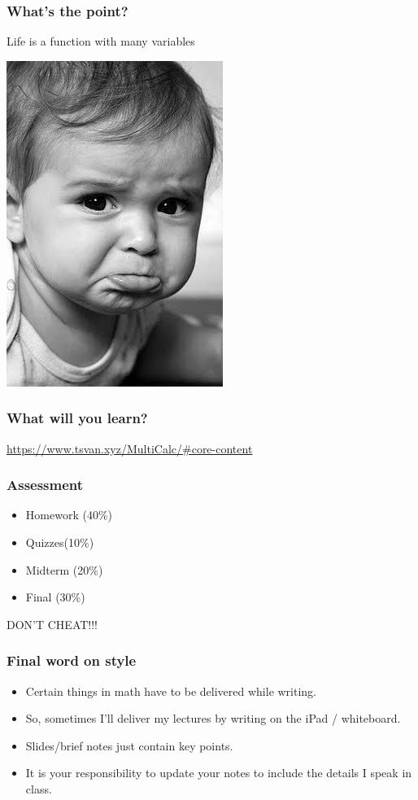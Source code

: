 \documentclass[aspectratio=169]{beamer}
\begin{document}
\begin{frame}
    \frametitle{What's the point?}
    Life is a function with many variables \pause

    \centering
    \includegraphics[height=0.5\textheight]{sad}
\end{frame}

\begin{frame}
    \frametitle{What will you learn?}
    \url{https://www.tsvan.xyz/MultiCalc/\#core-content}
\end{frame}


\begin{frame}
    \frametitle{Assessment}
    \begin{itemize}
        \item Homework (40\%)
        \item Quizzes(10\%)
        \item Midterm (20\%)
        \item Final (30\%)
    \end{itemize}
\end{frame}

\begin{frame}
    \centering
    DON'T CHEAT!!!
\end{frame}

\begin{frame}
    \frametitle{Final word on style}
    \begin{itemize}
        \item Certain things in math have to be delivered while writing.
        \item So, sometimes I'll deliver my lectures by writing on the iPad / whiteboard.
        \item Slides/brief notes just contain key points.
        \item It is your responsibility to update your notes to include the details I speak in class.
    \end{itemize}



\end{frame}
\end{document}
